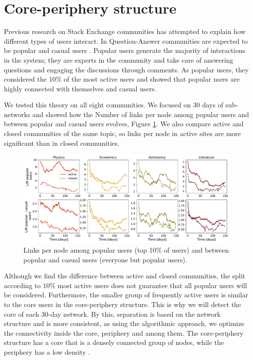 \section{Core-periphery structure}

Previous research on Stack Exchange communities has attempted to explain how different types of users interact. In Question-Answer communities are expected to be popular and casual users \cite{santos2019activity, santos2019self}. Popular users generate the majority of interactions in the system; they are experts in the community and take care of answering questions and engaging the discussions through comments. As popular users, they considered the $10 \%$ of the most active users and showed that popular users are highly connected with themselves and casual users.

We tested this theory on all eight communities. We focused on 30 days of sub-networks and showed how the Number of links per node among popular users and between popular and casual users evolves, Figure \ref{fig:pop_cas_users}. We also compare active and closed communities of the same topic, so links per node in active sites are more significant than in closed communities.

\begin{figure}[h!]
	\centering
	\includegraphics[width=\linewidth]{figures/stackexchange/popular_casual_users.pdf}
	\caption[Number of links per node]{Links per node among popular users (top 10\% of users) and between popular and casual users (everyone but popular users).}
	\label{fig:pop_cas_users}
\end{figure} 

Although we find the difference between active and closed communities, the split according to $10\%$  most active users does not guarantee that all popular users will be considered. Furthermore, the smaller group of frequently active users is similar to the core users in the core-periphery structure. This is why we will detect the core of each 30-day network. By this, separation is based on the network structure and is more consistent, as using the algorithmic approach, we optimize the connectivity inside the core, periphery and among them. The core-periphery structure has a core that is a densely connected group of nodes, while the periphery has a low density \cite{fortunato2010community, gallagher2020clarified}. 

